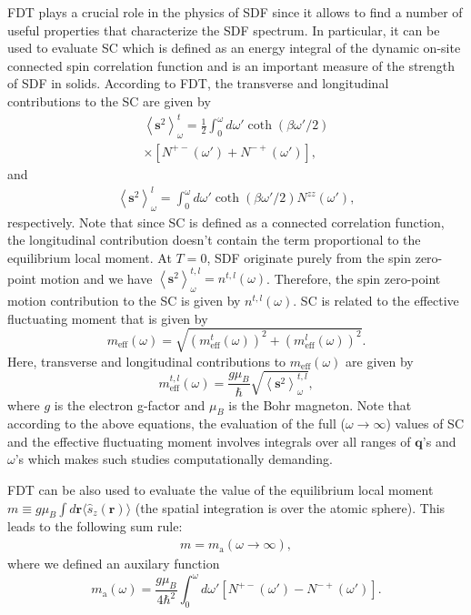 FDT plays a crucial role in the physics of SDF since it allows to find a number of useful properties that characterize the SDF spectrum. In particular, it can be used to evaluate SC which is defined as an energy integral of the dynamic on-site connected spin correlation function and is an important measure of the strength of SDF in solids. According to FDT, the transverse and longitudinal contributions to the SC are given by
\begin{eqnarray}
\left\langle\mathbf{s}^{2}\right\rangle^t_\omega =\frac{1}{2}\int _{0}^{\omega }d\omega'\coth{(\beta\omega'/2)} \\
\times\left[N^{+-}(\omega')+N^{-+}(\omega')\right],
\label{SCt}
\end{eqnarray}
and
\begin{eqnarray}
\left\langle\mathbf{s}^{2}\right\rangle^l_\omega =\int _{0}^{\omega }d\omega'\coth{(\beta\omega'/2)}N^{zz}(\omega'),
\label{SCl}
\end{eqnarray}
respectively. Note that since SC is defined as a connected correlation function, the longitudinal contribution doesn't contain the term proportional to the equilibrium local moment. At $T=0$, SDF originate purely from the spin zero-point motion and we have $\left\langle\mathbf{s}^{2}\right\rangle^{t,l}_\omega=n^{t,l}(\omega)$. Therefore, the spin zero-point motion contribution to the SC is given by $n^{t,l}(\omega)$. SC is related to the effective fluctuating moment that is given by
\begin{equation}
m_{\text{eff}}(\omega)=\sqrt{\left(m_{\text{eff}}^{t}(\omega)\right)^2+\left(m_{\text{eff}}^{l}(\omega)\right)^2}.
\label{meff}
\end{equation}
Here, transverse and longitudinal contributions to $m_{\text{eff}}(\omega)$ are given by
\begin{equation}
m_{\text{eff}}^{t,l}(\omega)=\frac{g\mu_B}{\hbar}\sqrt{\left\langle\mathbf{s}^{2}\right\rangle^{t,l}_\omega},
\label{mtleff}
\end{equation}
where $g$ is the electron g-factor and $\mu_B$ is the Bohr magneton. Note that according to the above equations, the evaluation of the full ($\omega\rightarrow\infty$) values of SC and the effective fluctuating moment involves integrals over all ranges of $\mathbf{q}$'s and $\omega$'s which makes such studies computationally demanding.

FDT can be also used to evaluate the value of the equilibrium local moment $m\equiv g\mu_B\int d\mathbf{r}\langle \hat{s}_z(\mathbf{r})\rangle$ (the spatial integration is over the atomic sphere). This leads to the following sum rule:
\begin{eqnarray}
m=m_{\text{a}}(\omega\rightarrow\infty),
\label{SumRuleEq}
\end{eqnarray}
where we defined an auxilary function 
\begin{equation}
m_{\text{a}}(\omega)=\frac{g\mu_B}{4\hbar^2}\int_0^\omega d\omega'\left[N^{+-}(\omega')-N^{-+}(\omega')\right].
\label{m0omega}
\end{equation}


